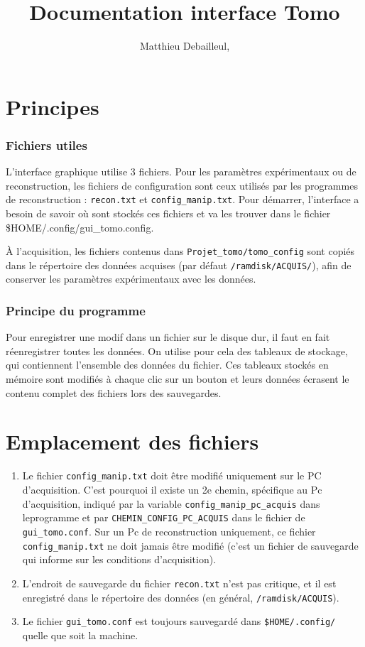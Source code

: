\documentclass[	french,DIV=calc,%
							paper=a4,%
							fontsize=11pt,%
							twocolumn]{scrartcl}	 					%
\title{Documentation interface Tomo}					%
\author{Matthieu Debailleul, }											%
\date{}																				%
\newcommand{\code}[1]{\texttt{#1}}
\newcommand{\initial}[1]{%
     \lettrine[lines=3,lhang=0.3,nindent=0em]{
     				\color{DarkGoldenrod}
     				{\textsf{#1}}}{}}
\begin{document}
\maketitle
\thispagestyle{fancy} 			%


\section{Principes}
\subsubsection*{Fichiers utiles}
L'interface graphique utilise 3 fichiers. Pour les paramètres expérimentaux ou de reconstruction,  les fichiers de configuration sont ceux utilisés par  les programmes de reconstruction :  \code{recon.txt} et  \code{config\_manip.txt}.
Pour démarrer, l'interface a besoin de savoir où sont stockés ces fichiers et va les trouver dans le fichier  \$HOME/.config/gui\_tomo.config.



À l'acquisition, les fichiers contenus dans \code{Projet\_tomo/tomo\_config} sont copiés dans le répertoire des données acquises (par défaut \code{/ramdisk/ACQUIS/}), afin de conserver les paramètres expérimentaux avec les données. 
\subsubsection*{Principe du programme}
Pour enregistrer une modif dans un fichier sur le disque dur, il faut en fait réenregistrer toutes les données.
On utilise pour cela des tableaux de stockage, qui contiennent l'ensemble des données du fichier. Ces tableaux stockés en mémoire sont modifiés à chaque clic sur un bouton et leurs données écrasent le contenu complet  des fichiers lors des sauvegardes.


\section{Emplacement des fichiers}
\begin{enumerate}
 \item Le fichier  \code{config\_manip.txt} doit être modifié uniquement sur le PC d'acquisition. C'est pourquoi il existe un 2e chemin, spécifique au Pc d'acquisition, indiqué par la variable \code{config\_manip\_pc\_acquis} dans leprogramme et par \code{CHEMIN\_CONFIG\_PC\_ACQUIS} dans le fichier de \code{gui\_tomo.conf}. 
Sur un Pc de reconstruction uniquement, ce fichier \code{config\_manip.txt} ne doit jamais être modifié (c'est un fichier de sauvegarde qui informe sur les conditions d'acquisition).

\item L'endroit de sauvegarde du fichier  \code{recon.txt} n'est pas critique, et il est enregistré dans le répertoire des données (en général, \code{/ramdisk/ACQUIS}). 
\item 
Le fichier \code{gui\_tomo.conf} est toujours sauvegardé dans \code{\$HOME/.config/} quelle que soit la machine. 
\end{enumerate}
\end{document}
